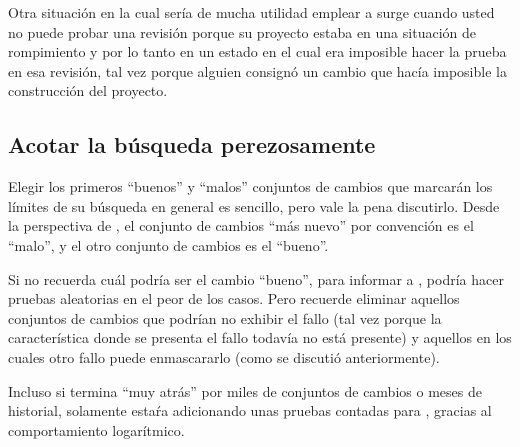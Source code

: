 Otra situación en la cual sería de mucha utilidad emplear a
 surge cuando usted no puede probar una
revisión porque su proyecto estaba en una situación de rompimiento y
por lo tanto en un estado en el cual era imposible hacer la prueba en
esa revisión, tal vez porque alguien consignó un cambio que hacía
imposible la construcción del proyecto.

\subsection{Acotar la búsqueda perezosamente}

Elegir los primeros ``buenos'' y ``malos'' conjuntos de cambios que
marcarán los límites de su búsqueda en general es sencillo, pero vale
la pena discutirlo.  Desde la perspectiva de , el
conjunto de cambios ``más nuevo'' por convención es el ``malo'', y el
otro conjunto de cambios es el ``bueno''.

Si no recuerda cuál podría ser el cambio ``bueno'', para informar a
, podría hacer pruebas aleatorias en el peor de los
casos. Pero recuerde eliminar aquellos conjuntos de cambios que
podrían no exhibir el fallo (tal vez porque la característica donde se
presenta el fallo todavía no está presente) y aquellos en los cuales
otro fallo puede enmascararlo (como se discutió anteriormente).

Incluso si termina ``muy atrás'' por miles de conjuntos de cambios o
meses de historial, solamente estaŕa adicionando unas pruebas contadas
para , gracias al comportamiento logarítmico.

